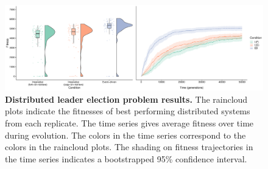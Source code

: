 \begin{figure}[h]
  \includegraphics[width=\columnwidth]{chapters/04-evolving-event-driven-programs-with-signalgp/media/election-fitness.pdf}
  \caption{\small 
  \textbf{Distributed leader election problem results.} 
  The raincloud plots indicate the fitnesses of best performing distributed systems from each replicate. 
  The time series gives average fitness over time during evolution. 
  The colors in the time series correspond to the colors in the raincloud plots. 
  The shading on fitness trajectories in the time series indicates a bootstrapped 95\% confidence interval.
  }
  \label{chapter:signalgp:fig:election-fitness}
\end{figure}
